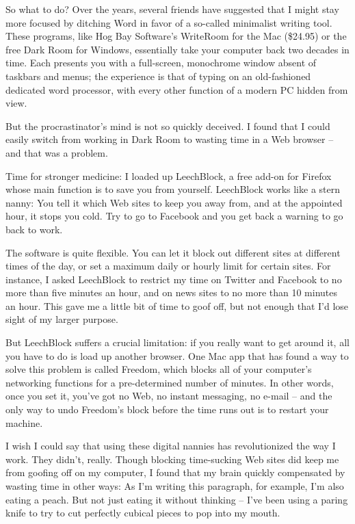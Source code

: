 ﻿\documentclass[12pt]{article}
\begin{document}
So what to do? Over the years, several friends have suggested that I might stay more focused by
ditching Word in favor of a so-called minimalist writing tool. These programs, like Hog Bay
Software's WriteRoom for the Mac (\$24.95) or the free Dark Room for Windows, essentially take your
computer back two decades in time. Each presents you with a full-screen, monochrome window absent of
taskbars and menus; the experience is that of typing on an old-fashioned dedicated word processor,
with every other function of a modern PC hidden from view.

But the procrastinator's mind is not so quickly deceived. I found that I could easily switch from
working in Dark Room to wasting time in a Web browser -- and that was a problem.

Time for stronger medicine: I loaded up LeechBlock, a free add-on for Firefox whose main function is
to save you from yourself. LeechBlock works like a stern nanny: You tell it which Web sites to keep
you away from, and at the appointed hour, it stops you cold. Try to go to Facebook and you get back
a warning to go back to work.

The software is quite flexible. You can let it block out different sites at different times of the
day, or set a maximum daily or hourly limit for certain sites. For instance, I asked LeechBlock to
restrict my time on Twitter and Facebook to no more than five minutes an hour, and on news sites to
no more than 10 minutes an hour. This gave me a little bit of time to goof off, but not enough that
I'd lose sight of my larger purpose.

But LeechBlock suffers a crucial limitation: if you really want to get around it, all you have to do
is load up another browser. One Mac app that has found a way to solve this problem is called
Freedom, which blocks all of your computer's networking functions for a pre-determined number of
minutes. In other words, once you set it, you've got no Web, no instant messaging, no e-mail -- and
the only way to undo Freedom's block before the time runs out is to restart your machine.

I wish I could say that using these digital nannies has revolutionized the way I work. They didn't,
really. Though blocking time-sucking Web sites did keep me from goofing off on my computer, I found
that my brain quickly compensated by wasting time in other ways: As I'm writing this paragraph, for
example, I'm also eating a peach. But not just eating it without thinking -- I've been using a
paring knife to try to cut perfectly cubical pieces to pop into my mouth.
\end{document}
